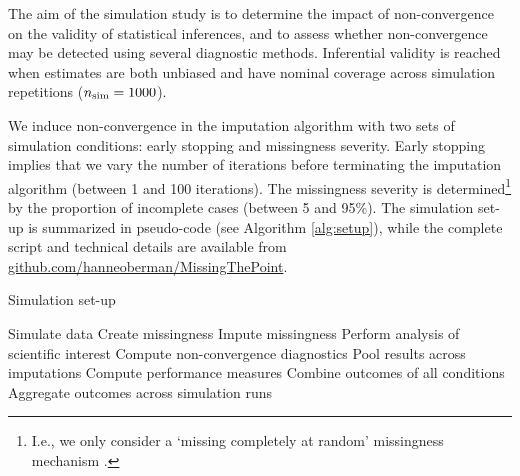 \documentclass{article}
\begin{document}
The aim of the simulation study is to determine the impact of non-convergence on the validity of statistical inferences, and to assess whether non-convergence may be detected using several diagnostic methods. Inferential validity is reached when estimates are both unbiased and have nominal coverage across simulation repetitions ($n_{\rm sim}=1000$).

We induce non-convergence in the imputation algorithm with two sets of simulation conditions: early stopping and missingness severity. Early stopping implies that we vary the number of iterations before terminating the imputation algorithm (between 1 and 100 iterations). The missingness severity is determined\footnote{I.e., we only consider a `missing completely at random' missingness mechanism \citep{rubin76}.} by the proportion of incomplete cases (between 5 and 95\%). The simulation set-up is summarized in pseudo-code (see Algorithm \ref{alg:setup}), while the complete script and technical details are available from \href{https://github.com/hanneoberman/MissingThePoint}{github.com/hanneoberman/MissingThePoint}. 

\begin{algorithm}
   \caption{Simulation set-up}
   \label{alg:setup}
\begin{algorithmic}
\STATE Simulate data 
\REPEAT 
  \STATE Create missingness
   \STATE Impute missingness
   \STATE Perform analysis of scientific interest
   \STATE Compute non-convergence diagnostics 
   \STATE Pool results across imputations
   \STATE Compute performance measures
   \ENDFOR
 \ENDFOR 
 \STATE Combine outcomes of all conditions
\STATE Aggregate outcomes across simulation runs
\end{algorithmic}
\end{algorithm}


% 
% 
% 
% 
% 
\end{document}

